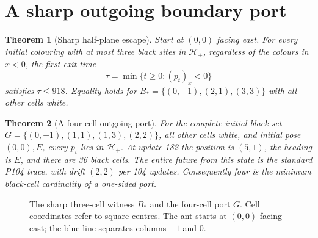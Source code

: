 \documentclass[11pt]{article}
\newtheorem{theorem}{Theorem}
\newcommand{\HH}{\mathcal H}
\begin{document}
\section{A sharp outgoing boundary port}

\begin{theorem}[Sharp half-plane escape]\label{th:threshold}
Start at $(0,0)$ facing east. For every initial colouring with at most three
black sites in $\HH_+$, regardless of the colours in $x<0$, the first-exit time
\[
 \tau=\min\{t\ge0:(p_t)_x<0\}
\]
satisfies $\tau\le918$. Equality holds for
$B_* = \{(0,-1),(2,1),(3,3)\}$ with all other cells white.
\end{theorem}

\begin{theorem}[A four-cell outgoing port]\label{th:port}
For the complete initial black set
$G=\{(0,-1),(1,1),(1,3),(2,2)\}$, all other cells white, and initial pose $(0,0),E$, every
$p_t$ lies in $\HH_+$. At update 182 the position is $(5,1)$, the heading is
$E$, and there are 36 black cells. The entire future from this state is the
standard P104 trace, with drift $(2,2)$ per 104 updates. Consequently four
is the minimum black-cell cardinality of a one-sided port.
\end{theorem}

\begin{figure}[ht]
\centering
{}
\caption{The sharp three-cell witness $B_*$ and the four-cell port $G$.
Cell coordinates refer to square centres. The ant starts at $(0,0)$ facing
east; the blue line separates columns $-1$ and $0$.}
\end{figure}
\end{document}

